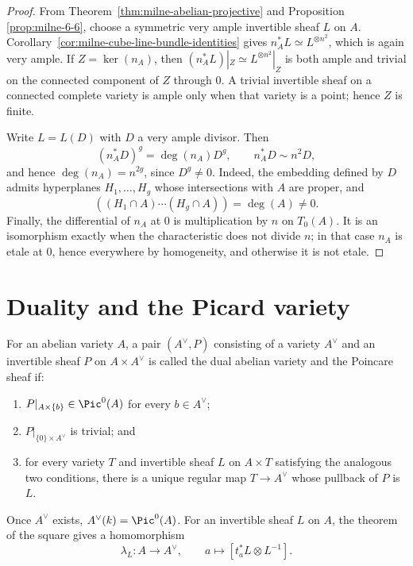 \begin{proof}
From Theorem~\ref{thm:milne-abelian-projective} and Proposition
\ref{prop:milne-6-6}, choose a symmetric very ample invertible sheaf $L$ on
$A$.  Corollary~\ref{cor:milne-cube-line-bundle-identities} gives
$n_A^*L\simeq L^{\otimes n^2}$, which is again very ample.  If
$Z=\ker(n_A)$, then
$(n_A^*L)|_Z\simeq L^{\otimes n^2}|_Z$ is both ample and trivial on the
connected component of $Z$ through $0$.  A trivial invertible sheaf on a
connected complete variety is ample only when that variety is a point; hence
$Z$ is finite.

Write $L=L(D)$ with $D$ a very ample divisor.  Then
\[
 (n_A^*D)^g=\deg(n_A)D^g,\qquad n_A^*D\sim n^2D,
\]
and hence $\deg(n_A)=n^{2g}$, since $D^g\ne0$.  Indeed, the embedding defined
by $D$ admits hyperplanes $H_1,\ldots,H_g$ whose intersections with $A$ are
proper, and
\[
((H_1\cap A)\cdots(H_g\cap A))=\deg(A)\ne0.
\]
Finally, the differential of $n_A$ at $0$ is multiplication by $n$ on
$T_0(A)$.  It is an isomorphism exactly when the characteristic does not
divide $n$; in that case $n_A$ is etale at $0$, hence everywhere by
homogeneity, and otherwise it is not etale.
\end{proof}

\section{Duality and the Picard variety}

\begin{definition}
\label{def:milne-dual-abelian}

For an abelian variety $A$, a pair $(A^\vee,P)$ consisting of a variety
$A^\vee$ and an invertible sheaf $P$ on $A\times A^\vee$ is called the dual
abelian variety and the Poincare sheaf if:
\begin{enumerate}
\item $P|_{A\times\{b\}}\in\Pic^0(A)$ for every $b\in A^\vee$;
\item $P|_{\{0\}\times A^\vee}$ is trivial; and
\item for every variety $T$ and invertible sheaf $L$ on $A\times T$ satisfying
the analogous two conditions, there is a unique regular map $T\to A^\vee$
whose pullback of $P$ is $L$.
\end{enumerate}
Once $A^\vee$ exists, $A^\vee(k)=\Pic^0(A)$.  For an invertible sheaf $L$
on $A$, the theorem of the square gives a homomorphism
\[
 \lambda_L:A\longrightarrow A^\vee,
 \qquad a\longmapsto[t_a^*L\otimes L^{-1}].
\]
\end{definition}

